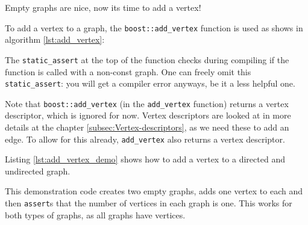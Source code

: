 Empty graphs are nice, now its time to add a vertex!

To add a vertex to a graph, 
the \verb;boost::add_vertex; 
function is used as shows in algorithm \ref{lst:add_vertex}:



The \verb;static_assert; 
at the top of the function checks during compiling if the function is called
with a non-const graph.
One can freely omit this \verb;static_assert;: you will get a compiler error anyways,
be it a less helpful one.

Note that \verb;boost::add_vertex; (in the \verb;add_vertex; function) 
returns a vertex
descriptor, which is ignored for now.
Vertex descriptors are looked at in more details 
at the chapter \ref{subsec:Vertex-descriptors}, 
as we need these to add an edge.
To allow for this already, \verb;add_vertex; also returns a vertex descriptor.

Listing \ref{lst:add_vertex_demo}
shows how to add a vertex to a directed and undirected graph.



This demonstration code creates two empty graphs, adds one vertex to each
and then \verb;assert;s that the number of vertices in each graph is one.
This works for both types of graphs, as all graphs have vertices.


